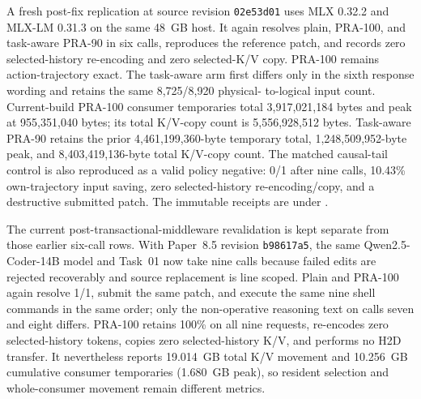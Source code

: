 \documentclass[11pt]{article}
\begin{document}
A fresh post-fix replication at source revision \texttt{02e53d01} uses MLX
0.32.2 and MLX-LM 0.31.3 on the same 48~GB host.  It again resolves plain,
PRA-100, and task-aware PRA-90 in six calls, reproduces the reference patch,
and records zero selected-history re-encoding and zero selected-K/V copy.
PRA-100 remains action-trajectory exact.  The task-aware arm first differs
only in the sixth response wording and retains the same 8,725/8,920 physical-
to-logical input count.  Current-build PRA-100 consumer temporaries total
3,917,021,184 bytes and peak at 955,351,040 bytes; its total K/V-copy count is
5,556,928,512 bytes.  Task-aware PRA-90 retains the prior 4,461,199,360-byte
temporary total, 1,248,509,952-byte peak, and 8,403,419,136-byte total K/V-copy
count.  The matched causal-tail control is also reproduced as a valid policy
negative: 0/1 after nine calls, 10.43\% own-trajectory input saving, zero
selected-history re-encoding/copy, and a destructive submitted patch.  The
immutable receipts are under
.

The current post-transactional-middleware revalidation is kept separate from
those earlier six-call rows.  With Paper~8.5 revision \texttt{b98617a5}, the
same Qwen2.5-Coder-14B model and Task~01 now take nine calls because failed
edits are rejected recoverably and source replacement is line scoped.  Plain
and PRA-100 again resolve 1/1, submit the same patch, and execute the same nine
shell commands in the same order; only the non-operative reasoning text on
calls seven and eight differs.  PRA-100 retains 100\% on all nine requests,
re-encodes zero selected-history tokens, copies zero selected-history K/V, and
performs no H2D transfer.  It nevertheless reports 19.014~GB total K/V movement
and 10.256~GB cumulative consumer temporaries (1.680~GB peak), so resident
selection and whole-consumer movement remain different metrics.
\end{document}
